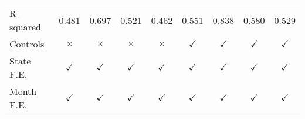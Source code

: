 \begin{tabular}{lcccccccc}
R-squared           &       0.481         &       0.697         &       0.521         &       0.462         &       0.551         &       0.838         &       0.580         &       0.529         \\
Controls            &    $\times$         &    $\times$         &    $\times$         &    $\times$         &$\checkmark$         &$\checkmark$         &$\checkmark$         &$\checkmark$         \\
State F.E.          &$\checkmark$         &$\checkmark$         &$\checkmark$         &$\checkmark$         &$\checkmark$         &$\checkmark$         &$\checkmark$         &$\checkmark$         \\
Month F.E.          &$\checkmark$         &$\checkmark$         &$\checkmark$         &$\checkmark$         &$\checkmark$         &$\checkmark$         &$\checkmark$         &$\checkmark$         \\



\end{tabular}
